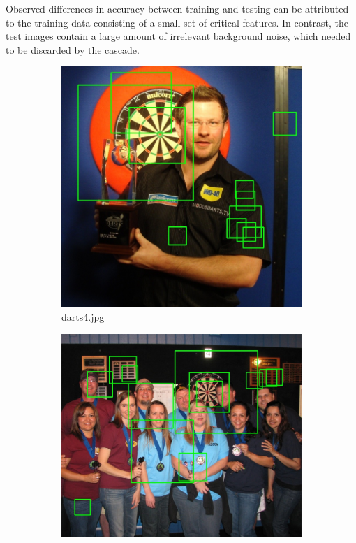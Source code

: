 \documentclass[conference]{IEEEtran}
\begin{document}
\par
Observed differences in accuracy between training and testing can be attributed to the training data consisting of a small set of critical features. In contrast, the test images contain a large amount of irrelevant background noise, which needed to be discarded by the cascade. 

\par
\begin{figure}[htb]
\centering
\begin{subfigure}{.5\linewidth}
  \centering
  \includegraphics[width=.9\linewidth]{images/task2/detected4.jpg}
  \caption{darts4.jpg}
  \label{fig:sub1}
\end{subfigure}%
\begin{subfigure}{.5\linewidth}
  \centering
  \includegraphics[width=.9\linewidth]{images/task2/detected5.jpg}

\end{subfigure}
\end{figure}
\end{document}
